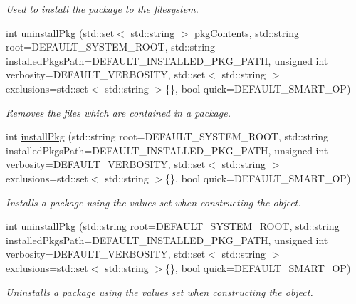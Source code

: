 \begin{DoxyCompactItemize}
\begin{DoxyCompactList}\small\item\em Used to install the package to the filesystem. \end{DoxyCompactList}\item 
int \mbox{\hyperlink{classPkg_a40d924a5dc7269051a5e0457ad4070cc}{uninstall\+Pkg}} (std\+::set$<$ std\+::string $>$ pkg\+Contents, std\+::string root=D\+E\+F\+A\+U\+L\+T\+\_\+\+S\+Y\+S\+T\+E\+M\+\_\+\+R\+O\+OT, std\+::string installed\+Pkgs\+Path=D\+E\+F\+A\+U\+L\+T\+\_\+\+I\+N\+S\+T\+A\+L\+L\+E\+D\+\_\+\+P\+K\+G\+\_\+\+P\+A\+TH, unsigned int verbosity=D\+E\+F\+A\+U\+L\+T\+\_\+\+V\+E\+R\+B\+O\+S\+I\+TY, std\+::set$<$ std\+::string $>$ exclusions=std\+::set$<$ std\+::string $>$\{\}, bool quick=D\+E\+F\+A\+U\+L\+T\+\_\+\+S\+M\+A\+R\+T\+\_\+\+OP)
\begin{DoxyCompactList}\small\item\em Removes the files which are contained in a package. \end{DoxyCompactList}\item 
int \mbox{\hyperlink{classPkg_a3f2664c5a3ca862ff8b9ab91417495bc}{install\+Pkg}} (std\+::string root=D\+E\+F\+A\+U\+L\+T\+\_\+\+S\+Y\+S\+T\+E\+M\+\_\+\+R\+O\+OT, std\+::string installed\+Pkgs\+Path=D\+E\+F\+A\+U\+L\+T\+\_\+\+I\+N\+S\+T\+A\+L\+L\+E\+D\+\_\+\+P\+K\+G\+\_\+\+P\+A\+TH, unsigned int verbosity=D\+E\+F\+A\+U\+L\+T\+\_\+\+V\+E\+R\+B\+O\+S\+I\+TY, std\+::set$<$ std\+::string $>$ exclusions=std\+::set$<$ std\+::string $>$\{\}, bool quick=D\+E\+F\+A\+U\+L\+T\+\_\+\+S\+M\+A\+R\+T\+\_\+\+OP)
\begin{DoxyCompactList}\small\item\em Installs a package using the values set when constructing the object. \end{DoxyCompactList}\item 
int \mbox{\hyperlink{classPkg_af9c29c6fd37d08121619d2dc42fcc07e}{uninstall\+Pkg}} (std\+::string root=D\+E\+F\+A\+U\+L\+T\+\_\+\+S\+Y\+S\+T\+E\+M\+\_\+\+R\+O\+OT, std\+::string installed\+Pkgs\+Path=D\+E\+F\+A\+U\+L\+T\+\_\+\+I\+N\+S\+T\+A\+L\+L\+E\+D\+\_\+\+P\+K\+G\+\_\+\+P\+A\+TH, unsigned int verbosity=D\+E\+F\+A\+U\+L\+T\+\_\+\+V\+E\+R\+B\+O\+S\+I\+TY, std\+::set$<$ std\+::string $>$ exclusions=std\+::set$<$ std\+::string $>$\{\}, bool quick=D\+E\+F\+A\+U\+L\+T\+\_\+\+S\+M\+A\+R\+T\+\_\+\+OP)
\begin{DoxyCompactList}\small\item\em Uninstalls a package using the values set when constructing the object. \end{DoxyCompactList}\item 

\end{DoxyCompactItemize}
